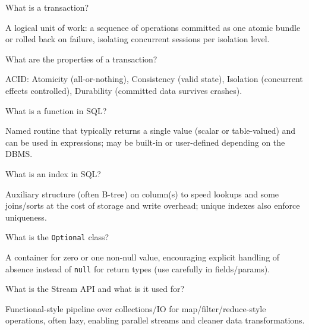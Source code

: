\newpage


\question[4]
What is a transaction?
\makeemptybox{1.05in}
\begin{solution}
  A logical unit of work: a sequence of operations committed as one atomic bundle or rolled back on failure, isolating concurrent sessions per isolation level.
\end{solution}

\question[4]
What are the properties of a transaction?
\makeemptybox{1.25in}
\begin{solution}
  ACID: Atomicity (all-or-nothing), Consistency (valid state), Isolation (concurrent effects controlled), Durability (committed data survives crashes).
\end{solution}

\question[4]
What is a function in SQL?
\makeemptybox{1.15in}
\begin{solution}
  Named routine that typically returns a single value (scalar or table-valued) and can be used in expressions; may be built-in or user-defined depending on the DBMS.
\end{solution}

\question[4]
What is an index in SQL?
\makeemptybox{1.2in}
\begin{solution}
  Auxiliary structure (often B-tree) on column(s) to speed lookups and some joins/sorts at the cost of storage and write overhead; unique indexes also enforce uniqueness.
\end{solution}

\newpage


\question[4]
What is the \texttt{Optional} class?
\makeemptybox{1.2in}
\begin{solution}
  A container for zero or one non-null value, encouraging explicit handling of absence instead of \texttt{null} for return types (use carefully in fields/params).
\end{solution}

\question[4]
What is the Stream API and what is it used for?
\makeemptybox{1.35in}
\begin{solution}
  Functional-style pipeline over collections/IO for map/filter/reduce-style operations, often lazy, enabling parallel streams and cleaner data transformations.
\end{solution}

